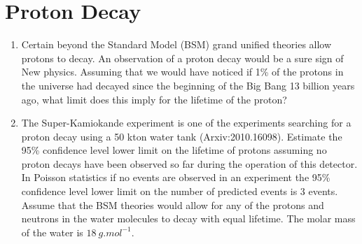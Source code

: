 \documentclass[12pt]{article}
\begin{document}
\section{Proton Decay}
\begin{problem}
  \begin{enumerate}[label = (\alph*)]
  \item Certain beyond the Standard Model (BSM) grand unified theories allow protons to decay. An observation of a proton decay would be a sure sign of New physics. Assuming that we would have noticed if 1\% of the protons in the universe had decayed since the beginning of the Big Bang 13 billion years ago, what limit does this imply for the lifetime of the proton?
  \item The Super-Kamiokande experiment is one of the experiments searching for a proton decay using a 50 kton water tank (Arxiv:2010.16098).
Estimate the 95\% confidence level lower limit on the lifetime of protons assuming no proton decays have been observed so far during the operation of this detector. In Poisson statistics if no events are observed in an experiment the 95\% confidence level lower limit on the number of predicted events is 3 events. Assume that the BSM theories would allow for any of the protons and neutrons in the water molecules to decay with equal lifetime. The molar mass of the water is $\SI{18}{g.mol^{-1}}$.
  \end{enumerate}
\end{problem}
\end{document}
